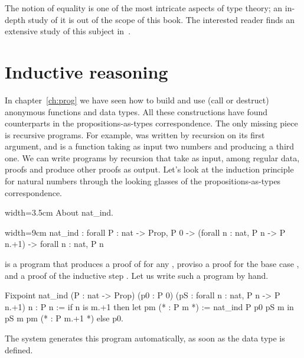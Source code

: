 The notion of equality is one of the most intricate aspects of type
theory; an in-depth study of it is out of the scope of this book.  The interested reader
finds an extensive study of this subject in~\cite{hottbook}.  %


\section{Inductive reasoning}\label{ssec:indreason}

In chapter~\ref{ch:prog} we have seen how to build and use (call or destruct)
anonymous functions and data types.  All these
constructions have found counterparts in the propositions-as-types correspondence.
The only missing piece is recursive programs.  For example,
 was written by recursion on its first argument, and is a
function taking as input two numbers and producing a third one.
We can write programs by recursion that take as input, among regular  data,
proofs and produce  other proofs as output.  Let's look at the
induction principle for natural numbers through the looking glasses
 of the
propositions-as-types correspondence.

\begin{coq}{}{width=3.5cm}
About nat_ind.
\end{coq}
\begin{coqout}{}{width=9cm}
nat_ind : forall P : nat -> Prop,
  P 0 -> (forall n : nat, P n -> P n.+1) -> forall n : nat, P n
\end{coqout}
 is a program that produces a proof of  for any ,
proviso a proof for the base case , and a proof
of the inductive step .
Let us write such a program by hand.

\begin{coq}{}{}
Fixpoint nat_ind (P : nat -> Prop)
  (p0 : P 0) (pS : forall n : nat, P n -> P n.+1) n : P n :=
  if n is m.+1 then
    let pm (* : P m *) := nat_ind P p0 pS m in
    pS m pm (* : P m.+1 *)
  else p0.
\end{coq}

The \Coq{} system generates this program automatically, as soon as
 the  data type
is defined. 

